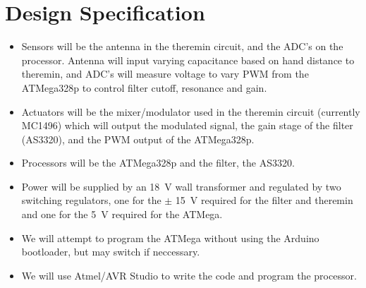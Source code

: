 \documentclass[a4paper,12pt]{article}
\begin{document}
\section*{Design Specification}
\begin{itemize}
	\item Sensors will be the antenna in the theremin circuit, and the ADC's on the processor. Antenna will input varying capacitance based on hand distance to theremin, and ADC's will measure voltage to vary PWM from the ATMega328p to control filter cutoff, resonance and gain.
	\item Actuators will be the mixer/modulator used in the theremin circuit (currently MC1496) which will output the modulated signal, the gain stage of the filter (AS3320), and the PWM output of the ATMega328p.
	\item Processors will be the ATMega328p and the filter, the AS3320.
	\item Power will be supplied by an \SI{18}{\volt} wall transformer and regulated by two switching regulators, one for the $\pm$ \SI{15}{\volt} required for the filter and theremin and one for the \SI{5}{\volt} required for the ATMega.
	\item We will attempt to program the ATMega without using the Arduino bootloader, but may switch if neccessary. 
	\item We will use Atmel/AVR Studio to write the code and program the processor.
\end{itemize}
\end{document}
